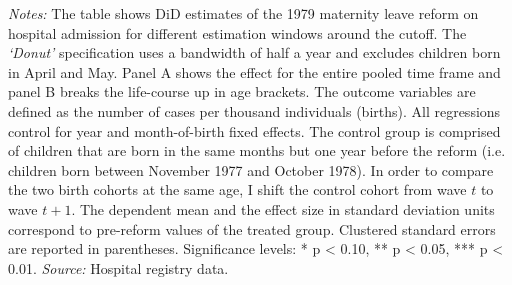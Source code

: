 \begin{landscape}
\begin{table}[H]
\begin{threeparttable}
{\begin{tabular}{l*{12}{c}}
 		\end{tabular}}
 		\begin{tablenotes} 
 			\item \scriptsize \emph{Notes:} The table shows DiD estimates of the 1979 maternity leave reform on hospital admission for different estimation windows around the cutoff. The \textit{`Donut'} specification uses a bandwidth of half a year and excludes children born in April and May. Panel A shows the effect for the entire pooled time frame and panel B breaks the life-course up in age brackets. The outcome variables are defined as the number of cases per thousand individuals (births). All regressions control for year and month-of-birth fixed effects. The control group is comprised of children that are born in the same months but one year before the reform (i.e. children born between November 1977 and October 1978). In order to compare the two birth cohorts at the same age, I shift the control cohort from wave $t$ to wave $t+1$. The dependent mean and the effect size in standard deviation units correspond to pre-reform values of the treated group. Clustered standard errors are reported in parentheses. \newline Significance levels: * p < 0.10, ** p < 0.05, *** p < 0.01. \newline 	\emph{Source:} Hospital registry data.
 		\end{tablenotes} 
 	\end{threeparttable} 
 \end{table}
\vspace*{\fill}\clearpage 
\end{landscape}
